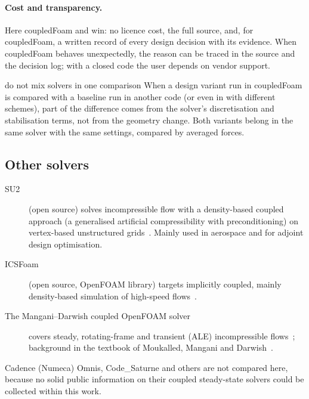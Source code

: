 \paragraph{Cost and transparency.} Here coupledFoam and 
win: no licence cost, the full source, and, for coupledFoam, a written
record of every design decision with its evidence. When coupledFoam
behaves unexpectedly, the reason can be traced in the source and the
decision log; with a closed code the user depends on vendor support.

\begin{pitfall}{do not mix solvers in one comparison}
  When a design variant run in coupledFoam is compared with a baseline run in
  another code (or even in  with different schemes), part
  of the difference comes from the solver's discretisation and
  stabilisation terms, not from the geometry change. Both variants belong
  in the same solver with the same settings, compared by averaged forces.
\end{pitfall}

\subsection{Other solvers}\label{sec:cmp-others}

\begin{description}
\item[SU2] (open source) solves incompressible flow with a
  density-based coupled approach (a generalised artificial compressibility
  with preconditioning) on vertex-based unstructured
  grids~\cite{cmp-Economon2020}. Mainly used in aerospace and for adjoint
  design optimisation.
\item[ICSFoam] (open source, OpenFOAM library) targets implicitly coupled,
  mainly density-based simulation of high-speed flows~\cite{Oliani2023}.
\item[The Mangani--Darwish coupled OpenFOAM solver] covers steady,
  rotating-frame and transient (ALE) incompressible
  flows~\cite{Mangani2014a,Mangani2014b,Mangani2017}; background in the
  textbook of Moukalled, Mangani and Darwish~\cite{cmp-Moukalled2016}.
\end{description}
Cadence (Numeca) Omnis, Code\_Saturne and others are not compared here,
because no solid public information on their coupled steady-state solvers
could be collected within this work.

